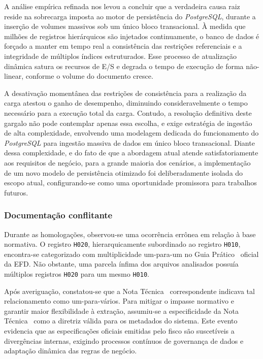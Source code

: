 A análise empírica refinada nos levou a concluir que a verdadeira causa
raiz reside na sobrecarga imposta ao motor de persistência do
\textit{PostgreSQL}, durante a inserção de volumes massivos sob um único bloco
transacional. À medida que milhões de registros hierárquicos são injetados
continuamente, o banco de dados é forçado a manter em tempo real a consistência
das restrições referenciais e a integridade de múltiplos índices estruturados.
Esse processo de atualização dinâmica satura os recursos de E/S e degrada o
tempo de execução de forma não-linear, conforme o volume do documento cresce.

A desativação momentânea das restrições de consistência para
a realização da carga atestou o ganho de desempenho, diminuindo
consideravelmente o tempo necessário para a execução total da carga. Contudo,
a resolução definitiva deste gargalo não pode contemplar apenas essa escolha,
e exige estratégia de ingestão de
alta complexidade, envolvendo uma modelagem dedicada do funcionamento do
\textit{PostgreSQL} para ingestão massiva de dados em único bloco transacional.
Diante dessa complexidade, e do fato de que a abordagem atual atende
satisfatoriamente aos requisitos de negócio, para a grande maioria dos
cenários, a implementação de um novo modelo de persistência otimizado foi
deliberadamente isolada do escopo atual, configurando-se como uma oportunidade
promissora para trabalhos futuros.

\subsubsection{Documentação conflitante}
\label{sec:documentacao_conflitante}
Durante as homologações, observou-se uma ocorrência errônea em relação à
base normativa. O registro \texttt{H020}, hierarquicamente subordinado ao
registro \texttt{H010}, encontra-se categorizado com multiplicidade
um-para-um no Guia Prático~\cite{guia_pratico_efd} oficial da EFD. Não obstante,
uma parcela ínfima dos arquivos analisados possuía
múltiplos registros \texttt{H020} para um mesmo \texttt{H010}.

Após averiguação, constatou-se que a Nota Técnica~\cite{nota_tecnica_efd}
correspondente indicava tal relacionamento como um-para-vários. Para mitigar o
impasse normativo e garantir maior flexibilidade à extração, assumiu-se a
especificidade da Nota Técnica~\cite{nota_tecnica_efd} como a diretriz válida
para os metadados do sistema. Este evento evidencia que as especificações
oficiais emitidas pelo fisco são suscetíveis a divergências internas, exigindo
processos contínuos de governança de dados e adaptação dinâmica das regras de
negócio.

